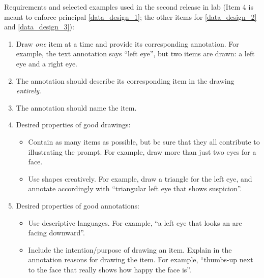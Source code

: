 

Requirements and selected examples used in the second release in lab (Item 4 is meant to enforce principal \ref{data_design_1}; the other items for \ref{data_design_2} and \ref{data_design_3}):
\begin{enumerate}
\item Draw \textit{one} item at a time and provide its corresponding annotation. For example, the text annotation says ``left eye'', but two items are drawn: a left eye and a right eye.
\item The annotation should describe its corresponding item in the drawing \textit{entirely}.
\item The annotation should name the item.
\item Desired properties of good drawings:
\begin{itemize}
    \item Contain as many items as possible, but be sure that they all contribute to illustrating the prompt. For example, draw more than just two eyes for a face.
    \item Use shapes creatively. For example, draw a triangle for the left eye, and annotate accordingly with ``triangular left eye that shows suspicion''.
\end{itemize}
\item Desired properties of good annotations:
\begin{itemize}
    \item Use descriptive languages. For example, ``a left eye that looks an arc facing downward''.
    \item Include the intention/purpose of drawing an item. Explain in the annotation reasons for drawing the item. For example, ``thumbs-up next to the face that really shows how happy the face is''.
\end{itemize}
\end{enumerate}

